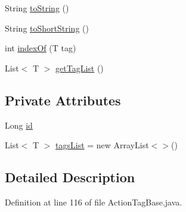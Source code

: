 \begin{DoxyCompactItemize}
\item 
String \hyperlink{classit_1_1emarolab_1_1cagg_1_1core_1_1evaluation_1_1semanticGrammar_1_1syntaxCompiler_1_1Action35425350c71420bf03866231192ab9e7_ab1b3340f0d3b3aaa6f35c35c71a7c69f}{to\-String} ()
\item 
String \hyperlink{classit_1_1emarolab_1_1cagg_1_1core_1_1evaluation_1_1semanticGrammar_1_1syntaxCompiler_1_1Action35425350c71420bf03866231192ab9e7_a7f88ac09db0747d6841ecb0b064c3d89}{to\-Short\-String} ()
\item 
int \hyperlink{classit_1_1emarolab_1_1cagg_1_1core_1_1evaluation_1_1semanticGrammar_1_1syntaxCompiler_1_1Action35425350c71420bf03866231192ab9e7_ad9f378de098ce8d0f0cb3a2c79e89e2f}{index\-Of} (T tag)
\item 
List$<$ T $>$ \hyperlink{classit_1_1emarolab_1_1cagg_1_1core_1_1evaluation_1_1semanticGrammar_1_1syntaxCompiler_1_1Action35425350c71420bf03866231192ab9e7_a4665b40e13c75851a1c7ef88efaab767}{get\-Tag\-List} ()
\end{DoxyCompactItemize}
\subsection*{Private Attributes}
\begin{DoxyCompactItemize}
\item 
Long \hyperlink{classit_1_1emarolab_1_1cagg_1_1core_1_1evaluation_1_1semanticGrammar_1_1syntaxCompiler_1_1Action35425350c71420bf03866231192ab9e7_af7887fb76f30ce7f0d33326ca8a0c0c2}{id}
\item 
List$<$ T $>$ \hyperlink{classit_1_1emarolab_1_1cagg_1_1core_1_1evaluation_1_1semanticGrammar_1_1syntaxCompiler_1_1Action35425350c71420bf03866231192ab9e7_a6228a1283b999cee38ca7c84746442fe}{tags\-List} = new Array\-List$<$$>$()
\end{DoxyCompactItemize}


\subsection{Detailed Description}


Definition at line 116 of file Action\-Tag\-Base.\-java.



